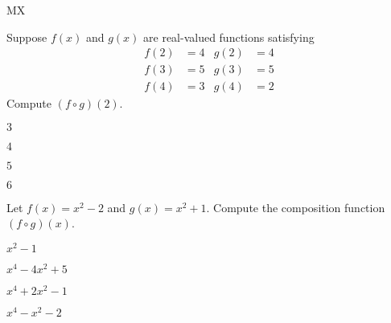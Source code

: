 \documentclass{article}
\begin{document}
\begin{module}{MX}{}
\begin{readinessAssuranceTest}
\setcounter{enumi}{30}



\item Suppose $f(x)$ and $g(x)$ are real-valued functions satisfying
\begin{align*}
f(2) &= 4 & g(2) & = 4 \\
f(3) &= 5 & g(3) &= 5 \\
f(4) &= 3 & g(4) &= 2
\end{align*}
Compute $(f \circ g)(2)$.
\begin{multicols}{4}
\begin{readinessAssuranceTestChoices}
\item $3$ %
\item $4$
\item $5$
\item $6$
\end{readinessAssuranceTestChoices}
\end{multicols}

\item Let $f(x) = x^2-2$ and $g(x)= x^2+1$.  Compute the composition function $(f \circ g)(x)$.
\begin{multicols}{4}
\begin{readinessAssuranceTestChoices}
\item $x^2-1$
\item $x^4-4x^2+5$
\item $x^4+2x^2-1$ %
\item $x^4-x^2-2$
\end{readinessAssuranceTestChoices}
\end{multicols}




\end{readinessAssuranceTest}
\end{module}
\end{document}
